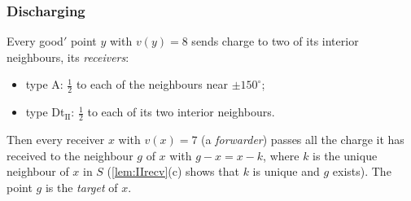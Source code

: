 \subsubsection*{Discharging}
Every good$'$ point $y$ with $v(y)=8$ sends charge to two of its interior neighbours, its \emph{receivers}:
\begin{itemize}[leftmargin=2em]
\item type A: $\frac12$ to each of the neighbours near $\pm150^\circ$;
\item type Dt$_{\mathrm{II}}$: $\frac12$ to each of its two interior neighbours.
\end{itemize}
Then every receiver $x$ with $v(x)=7$ (a \emph{forwarder}) passes all the charge it has received to the neighbour $g$ of $x$ with $g-x=x-k$, where $k$ is the unique neighbour of $x$ in $S$ (\cref{lem:IIrecv}(c) shows that $k$ is unique and $g$ exists). The point $g$ is the \emph{target} of $x$.

